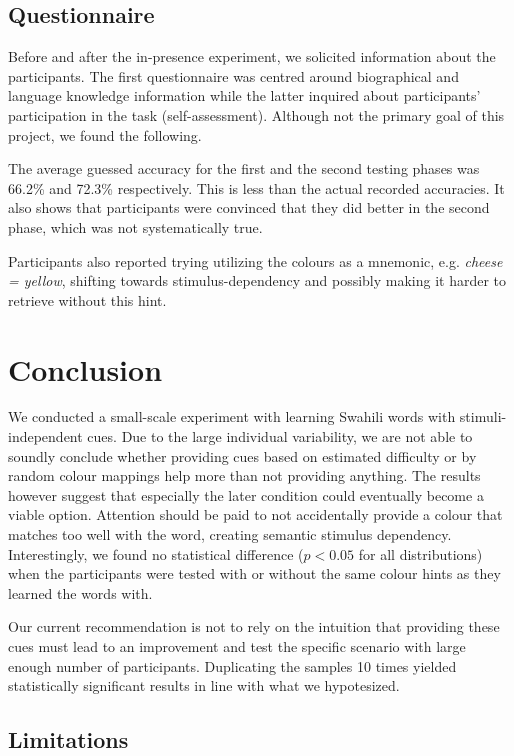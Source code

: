 \subsection{Questionnaire}

Before and after the in-presence experiment, we solicited information about the participants.
The first questionnaire was centred around biographical and language knowledge information while the latter inquired about participants' participation in the task (self-assessment).  
Although not the primary goal of this project, we found the following.

The average guessed accuracy for the first and the second testing phases was 66.2\% and 72.3\% respectively.
This is less than the actual recorded accuracies.
It also shows that participants were convinced that they did better in the second phase, which was not systematically true.

Participants also reported trying utilizing the colours as a mnemonic, e.g. \emph{cheese = yellow}, shifting towards stimulus-dependency and possibly making it harder to retrieve without this hint.

\section{Conclusion}

We conducted a small-scale experiment with learning Swahili words with stimuli-independent cues.
Due to the large individual variability, we are not able to soundly conclude whether providing cues based on estimated difficulty or by random colour mappings help more than not providing anything.
The results however suggest that especially the later condition could eventually become a viable option.
Attention should be paid to not accidentally provide a colour that matches too well with the word, creating semantic stimulus dependency.
Interestingly, we found no statistical difference ($p<0.05$ for all distributions) when the participants were tested with or without the same colour hints as they learned the words with.

Our current recommendation is not to rely on the intuition that providing these cues must lead to an improvement and test the specific scenario with large enough number of participants.
Duplicating the samples 10 times yielded statistically significant results in line with what we hypotesized.

\subsection{Limitations}

